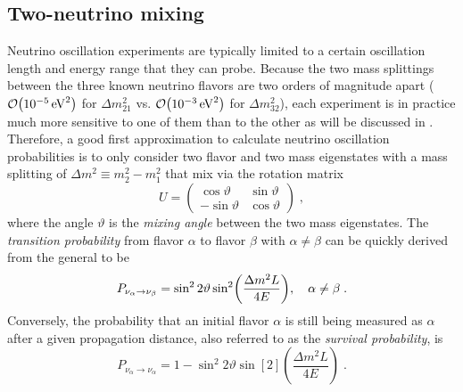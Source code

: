 \subsection{Two-neutrino mixing}
Neutrino oscillation experiments are typically limited to a certain oscillation length and energy range that they can probe. Because the two mass splittings between the three known neutrino flavors are two orders of magnitude apart ($\order{\SI{e-5}{eV^2}}$ for $\Delta m^2_{21}$ vs. $\order{\SI{e-3}{eV^2}}$ for $\Delta m^2_{32}$), each experiment is in practice much more sensitive to one of them than to the other as will be discussed in .
Therefore, a good first approximation to calculate neutrino oscillation probabilities is to only consider two flavor and two mass eigenstates with a mass splitting of $\Delta m^2 \equiv m_2^2 - m_1^2$ that mix via the rotation matrix
\begin{equation}
    U =
    \begin{pmatrix}
        \cos \vartheta & \sin \vartheta \\
        -\sin \vartheta & \cos \vartheta
    \end{pmatrix}\;,\label{eq:two-flav-pmns}
\end{equation}
where the angle $\vartheta$ is the \emph{mixing angle} between the two mass eigenstates.
The \emph{transition probability} from flavor $\alpha$ to flavor $\beta$ with $\alpha \neq \beta$ can be quickly derived from the general  to be
\begin{equation}
    P_{\nu_\alpha \rightarrow \nu_\beta} = \sin^2 2\vartheta \sin[2](\frac{\Delta m^2L}{4E})\qc\alpha \neq \beta\;.
\end{equation}
Conversely, the probability that an initial flavor $\alpha$ is still being measured as $\alpha$ after a given propagation distance, also referred to as the \emph{survival probability}, is
\begin{equation}
    P_{\nu_\alpha \rightarrow \nu_\alpha} = 1 - \sin^2 2\vartheta \sin[2](\frac{\Delta m^2L}{4E})\;.
\end{equation}

